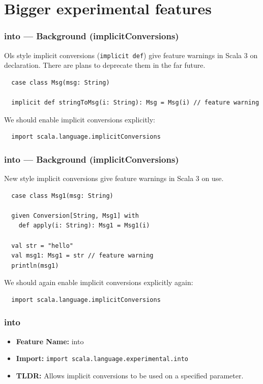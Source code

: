 \documentclass{beamer}
\begin{document}

\section{Bigger experimental features}

\begin{frame}[fragile]
  \frametitle{into --- Background (implicitConversions)}

  Ols style implicit conversions (\texttt{implicit def}) give feature warnings in Scala 3 on declaration. 
  There are plans to deprecate them in the far future.

  \begin{lstlisting}
  case class Msg(msg: String)

  implicit def stringToMsg(i: String): Msg = Msg(i) // feature warning
  \end{lstlisting}

  We should enable implicit conversions explicitly:

  \begin{lstlisting}
  import scala.language.implicitConversions
  \end{lstlisting}
\end{frame}

\begin{frame}[fragile]
  \frametitle{into --- Background (implicitConversions)}

  New style implicit conversions give feature warnings in Scala 3 on use.

  \begin{lstlisting}
  case class Msg1(msg: String)

  given Conversion[String, Msg1] with
    def apply(i: String): Msg1 = Msg1(i)

  val str = "hello"
  val msg1: Msg1 = str // feature warning
  println(msg1)
  \end{lstlisting}

  We should again enable implicit conversions explicitly again:

  \begin{lstlisting}
  import scala.language.implicitConversions
  \end{lstlisting}
\end{frame}

\begin{frame}[fragile]
  \frametitle{into}
  \begin{itemize}
    \item \textbf{Feature Name:} into
    \item \textbf{Import:} \texttt{import scala.language.experimental.into}
    \item \textbf{TLDR:} Allows implicit conversions to be used on a specified parameter.
  \end{itemize}
\end{frame}
\end{document}
